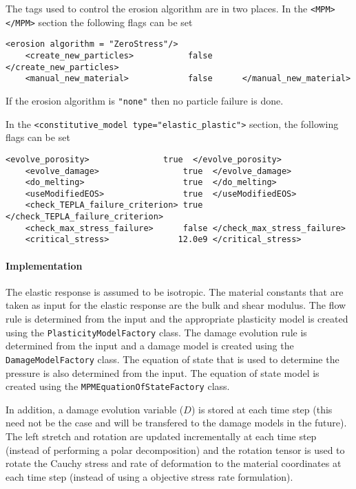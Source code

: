   The tags used to control the erosion algorithm are in two places.
  In the \verb|<MPM> </MPM>| section the following flags can be set
  \begin{Verbatim}[fontsize=\footnotesize]
    <erosion algorithm = "ZeroStress"/>
    <create_new_particles>           false      </create_new_particles>
    <manual_new_material>            false      </manual_new_material>
  \end{Verbatim}
  If the erosion algorithm is \verb|"none"| then no particle failure is done.

  In the \verb|<constitutive_model type="elastic_plastic">| section, the
  following flags can be set
  \begin{Verbatim}[fontsize=\footnotesize]
    <evolve_porosity>               true  </evolve_porosity>
    <evolve_damage>                 true  </evolve_damage>
    <do_melting>                    true  </do_melting>
    <useModifiedEOS>                true  </useModifiedEOS>
    <check_TEPLA_failure_criterion> true  </check_TEPLA_failure_criterion>
    <check_max_stress_failure>      false </check_max_stress_failure>
    <critical_stress>              12.0e9 </critical_stress>
  \end{Verbatim}

\paragraph{Implementation}
The elastic response is assumed to be isotropic.  The material
constants that are taken as input for the elastic response are the
bulk and shear modulus.  The flow rule is determined from the input
and the appropriate plasticity model is created using the
\verb+PlasticityModelFactory+ class.  The damage evolution rule
is determined from the input and a damage model is created using
the \verb+DamageModelFactory+ class.  The equation of state
that is used to determine the pressure is also determined from the
input.  The equation of state model is created using the
\verb+MPMEquationOfStateFactory+ class.

In addition, a damage evolution variable ($D$) is stored at each time
step (this need not be the case and will be transfered to the
damage models in the future).  The left stretch and rotation are
updated incrementally at each
time step (instead of performing a polar decomposition) and the
rotation tensor is used to rotate the Cauchy stress and rate of deformation
to the material coordinates at each time step (instead of using a
objective stress rate formulation).

